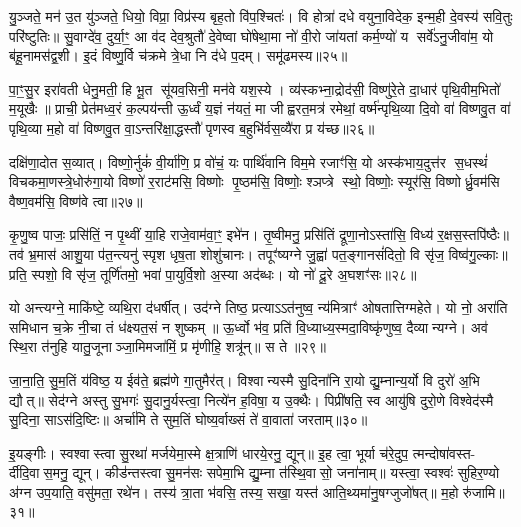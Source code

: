 {\anuvakamend[{नाम॑ सुप्रजा॒वनिः॒ स्वाहा॑ सि॒ꣳ॒हीः पञ्च॑त्रिशच्च॥12॥}]}

यु॒ञ्जते॒ मन॑ उ॒त यु॑ञ्जते॒ धियो॒ विप्रा॒ विप्र॑स्य बृह॒तो वि॑प॒श्चितः॑। वि होत्रा॑ दधे वयुना॒विदेक॒ इन्म॒ही दे॒वस्य॑ सवि॒तुः परि॑ष्टुतिः॥ सु॒वाग्दे॑व॒ दुर्या॒ꣳ॒ आ व॑द देव॒श्रुतौ॑ दे॒वेष्वा घो॑षेथा॒मा नो॑ वी॒रो जा॑यतां कर्म॒ण्यो॑ य सर्वे॑ऽनु॒जीवा॑म॒ यो ब॑हू॒नामस॑द्व॒शी। इ॒दं विष्णु॒र्वि च॑क्रमे त्रे॒धा नि द॑धे प॒दम्। समू॑ढमस्य॥२५॥

पा॒ꣳ॒सु॒र इरा॑वती धेनु॒मती॒ हि भू॒त सू॑यव॒सिनी॒ मन॑वे यश॒स्ये। व्य॑स्कभ्ना॒द्रोद॑सी॒ विष्णु॑रे॒ते दा॒धार॑ पृथि॒वीम॒भितो॑ म॒यूखैः॥ प्राची॒ प्रेत॑मध्व॒रं क॒ल्पय॑न्ती ऊ॒र्ध्वं य॒ज्ञं न॑यतं॒ मा जीह्वरत॒मत्र॑ रमेथां॒ वर्ष्म॑न्पृथि॒व्या दि॒वो वा॑ विष्णवु॒त वा॑ पृथि॒व्या म॒हो वा॑ विष्णवु॒त वा॒ऽन्तरि॑क्षा॒द्धस्तौ॑ पृणस्व ब॒हुभि॑र्वस॒व्यै॑रा प्र य॑च्छ॥२६॥

दक्षि॑णा॒दोत स॒व्यात्। विष्णो॒र्नुकं॑ वी॒र्या॑णि॒ प्र वो॑चं॒ यः पार्थि॑वानि विम॒मे रजाꣳ॑सि॒ यो अस्क॑भाय॒दुत्त॑र स॒धस्थं॑ विचकमा॒णस्त्रे॒धोरु॑गा॒यो विष्णो॑ र॒राट॑मसि॒ विष्णोः पृ॒ष्ठम॑सि॒ विष्णोः॒ श्ञप्त्रे स्थो॒ विष्णोः॒ स्यूर॑सि॒ विष्णोर्ध्रु॒वम॑सि वैष्ण॒वम॑सि॒ विष्ण॑वे त्वा॥२७॥

{\anuvakamend[{अ॒स्य॒ य॒च्छैका॒न्नच॑त्वारि॒ꣳ॒शच्च॑॥13॥}]}

कृ॒णु॒ष्व पाजः॒ प्रसि॑तिं॒ न पृ॒थ्वीं या॒हि राजे॒वाम॑वा॒ꣳ॒ इभे॑न। तृ॒ष्वीमनु॒ प्रसि॑तिं द्रूणा॒नोऽस्ता॑सि॒ विध्य॑ र॒क्षस॒स्तपि॑ष्ठैः॥ तव॑ भ्र॒मास॑ आशु॒या प॑त॒न्त्यनु॑ स्पृश धृष॒ता शोशु॑चानः। तपूꣳ॑ष्यग्ने जु॒ह्वा॑ पत॒ङ्गानसं॑दितो॒ वि सृ॑ज॒ विष्व॑गु॒ल्काः॥ प्रति॒ स्पशो॒ वि सृ॑ज॒ तूर्णि॑तमो॒ भवा॑ पा॒युर्वि॒शो अ॒स्या अद॑ब्धः। यो नो॑ दू॒रे अ॒घशꣳ॑सः॥२८॥

यो अन्त्यग्ने॒ माकि॑ष्टे॒ व्यथि॒रा द॑धर्षीत्। उद॑ग्ने तिष्ठ॒ प्रत्याऽऽत॑नुष्व॒ न्य॑मित्राꣳ॑ ओषतात्तिग्महेते। यो नो॒ अरा॑ति समिधान च॒क्रे नी॒चा तं ध॑क्ष्यत॒सं न शुष्कम्॥ ऊ॒र्ध्वो भ॑व॒ प्रति॑ वि॒ध्याध्य॒स्मदा॒विष्कृ॑णुष्व॒ दैव्यान्यग्ने। अव॑ स्थि॒रा त॑नुहि यातु॒जूनाञ्जा॒मिमजा॑मिं॒ प्र मृ॑णीहि॒ शत्रू॑न्॥ स ते॥२९॥

जा॒ना॒ति॒ सु॒म॒तिं य॑विष्ठ॒ य ईव॑ते॒ ब्रह्म॑णे गा॒तुमैर॑त्। विश्वान्यस्मै सु॒दिना॑नि रा॒यो द्यु॒म्नान्य॒र्यो वि दुरो॑ अ॒भि द्यौत्॥ सेद॑ग्ने अस्तु सु॒भगः॑ सु॒दानु॒र्यस्त्वा॒ नित्ये॑न ह॒विषा॒ य उ॒क्थैः। पिप्री॑षति॒ स्व आयु॑षि दुरो॒णे विश्वेद॑स्मै सु॒दिना॒ साऽस॑दि॒ष्टिः॥ अर्चा॑मि ते सुम॒तिं घोष्य॒र्वाख्सं ते॑ वा॒वाता॑ जरताम्॥३०॥

इ॒यङ्गीः। स्वश्वास्त्वा सु॒रथा॑ मर्जयेमा॒स्मे क्ष॒त्राणि॑ धारये॒रनु॒ द्यून्॥ इ॒ह त्वा॒ भूर्या च॑रे॒दुप॒ त्मन्दोषा॑वस्त- र्दीदि॒वास॒मनु॒ द्यून्। कीड॑न्तस्त्वा सु॒मन॑सः सपेमा॒भि द्यु॒म्ना त॑स्थि॒वासो॒ जना॑नाम्॥ यस्त्वा॒ स्वश्वः॑ सुहिर॒ण्यो अ॑ग्न उप॒याति॒ वसु॑मता॒ रथे॑न। तस्य॑ त्रा॒ता भ॑वसि॒ तस्य॒ सखा॒ यस्त॑ आति॒थ्यमा॑नु॒षग्जुजो॑षत्॥ म॒हो रु॑जामि॥३१॥

